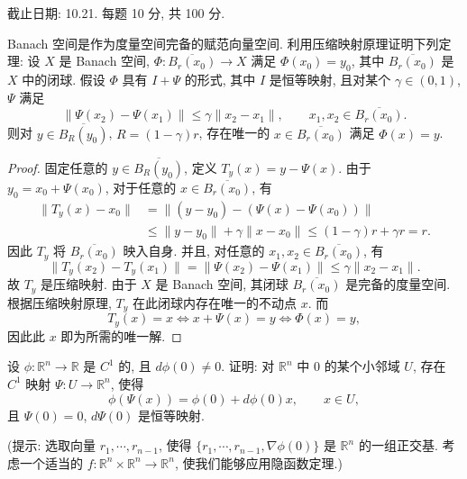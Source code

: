 \documentclass{article}
\begin{document}
截止日期: 10.21. 每题 10 分, 共 100 分.

\begin{problem}
  Banach 空间是作为度量空间完备的赋范向量空间. 利用压缩映射原理证明下列定理: 设 $X$ 是 Banach 空间, $\Phi:\overline{B_r(x_0)}\to X$ 满足 $\Phi(x_0)=y_0$, 其中 $\overline{B_r(x_0)}$ 是 $X$ 中的闭球. 假设 $\Phi$ 具有 $I+\Psi$ 的形式, 其中 $I$ 是恒等映射, 且对某个 $\gamma\in(0,1)$, $\Psi$ 满足
  \[
    \|\Psi(x_2)-\Psi(x_1)\|\leq\gamma\|x_2-x_1\|,\qquad x_1,x_2\in\overline{B_r(x_0)}.
  \]
  则对 $y\in\overline{B_R(y_0)}$, $R=(1-\gamma)r$, 存在唯一的 $x\in\overline{B_r(x_0)}$ 满足 $\Phi(x)=y$.
\end{problem}

\begin{proof}
	固定任意的 $y \in \overline{B_R(y_0)}$, 定义 $T_y(x) = y - \Psi(x)$. 由于 $y_0 = x_0 + \Psi(x_0)$, 对于任意的 $x \in \overline{B_r(x_0)}$, 有
	\begin{align*}
		\|T_y(x)-x_0\|
		&= \|(y-y_0)-(\Psi(x)-\Psi(x_0))\| \\
		&\le \|y-y_0\| + \gamma\|x-x_0\|
		\le (1-\gamma)r + \gamma r = r.
	\end{align*}
	因此 $T_y$ 将 $\overline{B_r(x_0)}$ 映入自身. 并且, 对任意的 $x_1,x_2 \in \overline{B_r(x_0)}$, 有
	\[ \|T_y(x_2)-T_y(x_1)\| = \|\Psi(x_2)-\Psi(x_1)\| \le \gamma\|x_2-x_1\|. \]
	故 $T_y$ 是压缩映射. 由于 $X$ 是 Banach 空间, 其闭球 $\overline{B_r(x_0)}$ 是完备的度量空间. 根据压缩映射原理, $T_y$ 在此闭球内存在唯一的不动点 $x$. 而
	\[ T_y(x)=x \Longleftrightarrow x+\Psi(x)=y \Longleftrightarrow \Phi(x)=y, \]
	因此此 $x$ 即为所需的唯一解.
\end{proof}



\begin{problem}
  设 $\phi:\mathbb{R}^n\to\mathbb{R}$ 是 $C^1$ 的, 且 $d\phi(0)\neq0$. 证明: 对 $\mathbb{R}^n$ 中 $0$ 的某个小邻域 $U$, 存在 $C^1$ 映射 $\Psi:U\to\mathbb{R}^n$, 使得
  \[
    \phi(\Psi(x))=\phi(0)+d\phi(0)x,\qquad x\in U,
  \]
  且 $\Psi(0)=0$, $d\Psi(0)$ 是恒等映射.

  (提示: 选取向量 $r_1,\cdots,r_{n-1}$, 使得 $\{r_1,\cdots,r_{n-1},\nabla\phi(0)\}$ 是 $\mathbb{R}^n$ 的一组正交基. 考虑一个适当的 $f:\mathbb{R}^n\times\mathbb{R}^n\to\mathbb{R}^n$, 使我们能够应用隐函数定理.)
\end{problem}
\end{document}

